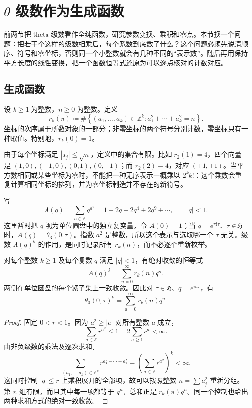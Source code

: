 \section{\texorpdfstring{\(\theta\)}{\AnalysisPdfTheta} 级数作为生成函数}
\label{b3:sec:2403}

前两节把 theta 级数看作全纯函数，研究参数变换、乘积和零点。本节换一个问题：把若干个这样的级数相乘后，每个系数到底数了什么？这个问题必须先说清顺序、符号和零坐标，否则同一个小整数就会有几种不同的“表示数”。随后再用保持平方长度的线性变换，把一个函数恒等式还原为可以逐点核对的计数对应。

\subsection{生成函数}
\label{b3:subsec:240301}

\begin{definition}[有序带符号的平方和表示数]\label{b3:def:24-square-representations}
设 \(k\ge1\) 为整数，\(n\ge0\) 为整数。定义
\[
 r_k(n)\coloneqq
 \#\left\{(a_1,\ldots,a_k)\in\mathbb Z^k:
              a_1^2+\cdots+a_k^2=n\right\}.
\]
坐标的次序属于所数对象的一部分；非零坐标的两个符号分别计数，零坐标只有一种取值。特别地，\(r_k(0)=1\)。
\end{definition}

由于每个坐标满足 \(|a_j|\le\sqrt n\)，定义中的集合有限。比如 \(r_2(1)=4\)，四个向量是 \((1,0),(-1,0),(0,1),(0,-1)\)；而 \(r_2(2)=4\)，对应 \((\pm1,\pm1)\)。当平方数相同或某些坐标为零时，不能把一种无序表示一概乘以 \(2^k k!\)：这个乘数会重复计算相同坐标的排列，并为零坐标制造并不存在的新符号。

\ProseParagraphBreak

写
\[
 A(q)=\sum_{a\in\mathbb Z}q^{a^2}
     =1+2q+2q^4+2q^9+\cdots,\qquad |q|<1.
\]
这里暂时把 \(q\) 视为单位圆盘中的独立复变量，令 \(A(0)=1\)；当 \(q=e^{\pi\mathrm{i}\tau}\)、\(\tau\in\mathfrak H\) 时，\(A(q)=\theta_3(0,\tau)\)。指数 \(a^2\) 是整数，所以这个表示与选取哪一个 \(\tau\) 无关。级数 \(A(q)^k\) 的作用，是同时记录所有 \(r_k(n)\)，而不必逐个重新枚举。

\begin{proposition}[平方和的生成函数]\label{b3:prop:24-square-generating}
对每个整数 \(k\ge1\) 及每个复数 \(q\) 满足 \(|q|<1\)，有绝对收敛的恒等式
\[
 A(q)^k=\sum_{n=0}^{\infty}r_k(n)q^n.
\]
两侧在单位圆盘的每个紧子集上一致收敛。因此对 \(\tau\in\mathfrak H\)、\(q=e^{\pi\mathrm{i}\tau}\)，有
\[
 \theta_3(0,\tau)^k=\sum_{n=0}^{\infty}r_k(n)q^n.
\]
\end{proposition}
\begin{proof}
固定 \(0<r<1\)。因为 \(a^2\ge |a|\) 对所有整数 \(a\) 成立，
\[
 \sum_{a\in\mathbb Z}r^{a^2}\le 1+2\sum_{a\ge1}r^a<\infty.
\]
由非负级数的乘法及逐次求和，
\[
 \sum_{(a_1,\ldots,a_k)\in\mathbb Z^k}
       r^{a_1^2+\cdots+a_k^2}
 =\left(\sum_{a\in\mathbb Z}r^{a^2}\right)^k<\infty.
\]
这同时控制 \(|q|\le r\) 上乘积展开的全部项，故可以按照整数 \(n=\sum a_j^2\) 重新分组。第 \(n\) 组有限，而且其中每一项都等于 \(q^n\)，总和正是 \(r_k(n)q^n\)。同一个控制也给出两种求和方式的绝对一致收敛。
\end{proof}

